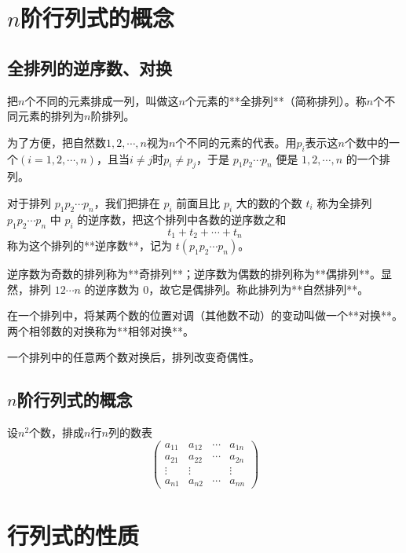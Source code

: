\section{$n$阶行列式的概念}

\subsection{全排列的逆序数、对换}
把$n$个不同的元素排成一列，叫做这$n$个元素的**全排列**（简称排列）。称$n$个不同元素的排列为$n$阶排列。

为了方便，把自然数$1,2,\cdots,n$视为$n$个不同的元素的代表。用$p_i$表示这$n$个数中的一个$(i=1,2,\cdots,n)$，且当$i\neq j$时$p_i\neq p_j$，于是 $p_1 p_2 \cdots p_n$ 便是 $1, 2, \cdots, n$ 的一个排列。

对于排列 $p_1 p_2 \cdots p_n$，我们把排在 $p_i$ 前面且比 $p_i$ 大的数的个数 $t_i$ 称为全排列 $p_1 p_2 \cdots p_n$ 中 $p_i$ 的逆序数，把这个排列中各数的逆序数之和
\[
t_1 + t_2 + \cdots + t_n
\]
称为这个排列的**逆序数**，记为 $t(p_1 p_2 \cdots p_n)$。

逆序数为奇数的排列称为**奇排列**；逆序数为偶数的排列称为**偶排列**。显然，排列 $12 \cdots n$ 的逆序数为 $0$，故它是偶排列。称此排列为**自然排列**。

在一个排列中，将某两个数的位置对调（其他数不动）的变动叫做一个**对换**。两个相邻数的对换称为**相邻对换**。

\begin{theorem}
一个排列中的任意两个数对换后，排列改变奇偶性。
\end{theorem}

\subsection{$n$阶行列式的概念}
\begin{definition}
设$n^2$个数，排成$n$行$n$列的数表
\[
\begin{pmatrix}
a_{11} & a_{12} & \cdots & a_{1n}\\
a_{21} & a_{22} & \cdots & a_{2n}\\
\vdots & \vdots & & \vdots\\
a_{n1} & a_{n2} & \cdots & a_{nn}
\end{pmatrix}
\]
\end{definition}


\section{行列式的性质}

